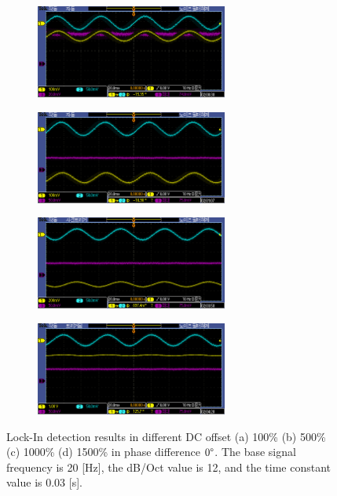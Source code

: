 \documentclass{article}
\begin{document}
 \begin{figure}[H]
  \begin{subfigure}[b]{6.3cm}
      \centering
      \includegraphics[width=6.3cm]{../additional_raw_data/TEK00250.png}
      \caption{}
  \end{subfigure}
  \hfill
  \begin{subfigure}[b]{6.3cm}
    \centering
    \includegraphics[width=6.3cm]{../additional_raw_data/TEK00254.png}
    \caption{}
\end{subfigure}
\hfill
\begin{subfigure}[b]{6.3cm}
  \centering
  \includegraphics[width=6.3cm]{../additional_raw_data/TEK00261.png}
  \caption{}
\end{subfigure}
\hfill
\begin{subfigure}[b]{6.3cm}
  \centering
  \includegraphics[width=6.3cm]{../additional_raw_data/TEK00266.png}
  \caption{}
\end{subfigure}
\hfill
  \caption{Lock-In detection results in different DC offset (a) 100\% (b) 500\% (c) 1000\% (d) 1500\% in phase difference $0\degree$.
    The base signal frequency is 20 [Hz], the dB/Oct value is 12, and the time constant value is 0.03 [s].
   }
   \label{fig: dc_offset_rawdata}
\end{figure}
\end{document}
